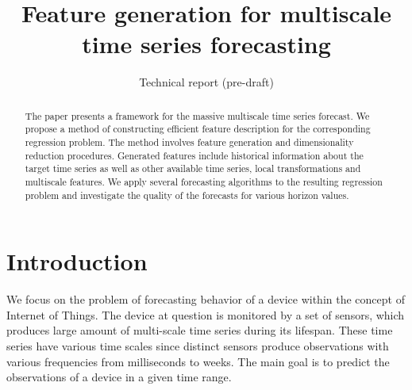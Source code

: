 \documentclass[conference]{IEEEtran}
\begin{document}
\title{Feature generation for multiscale time series forecasting}



\date{Technical report (pre-draft)}
\maketitle

\begin{abstract}
The paper presents a framework for the massive multiscale time series forecast. We propose a method of constructing efficient feature description for the corresponding regression problem. The method involves feature generation and dimensionality reduction procedures. Generated features include historical information about the target time series as well as other available time series, local transformations and  multiscale features. We apply several forecasting algorithms to the resulting regression problem and investigate the quality of the forecasts for various horizon values.
\end{abstract}



\section{Introduction}
We focus on the problem of forecasting behavior of a device within the concept of Internet of Things. The device at question is monitored by a set of sensors, which produces large amount of multi-scale time series during its lifespan. These time series have various time scales since distinct sensors produce observations with various frequencies from milliseconds to weeks.  The main goal is to predict the observations of a device in a given time range.
\end{document}
